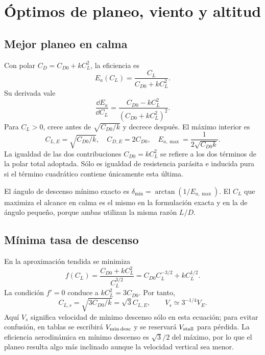\chapter{Óptimos de planeo, viento y altitud}\label{ch:planeo-punto}

\section{Mejor planeo en calma}
Con polar $C_D=C_{D0}+kC_L^2$, la eficiencia es
\begin{equation}
E_a(C_L)=\frac{C_L}{C_{D0}+kC_L^2}.
\end{equation}
Su derivada vale
\begin{equation}
\frac{\dd E_a}{\dd C_L}=
\frac{C_{D0}-kC_L^2}{(C_{D0}+kC_L^2)^2}.
\end{equation}
Para $C_L>0$, crece antes de $\sqrt{C_{D0}/k}$ y decrece después. El máximo interior es
\begin{equation}
C_{L,E}=\sqrt{C_{D0}/k},\quad C_{D,E}=2C_{D0},\quad
E_{a,\max}=\frac1{2\sqrt{C_{D0}k}}.\label{eq:ldmax}
\end{equation}
La igualdad de las dos contribuciones $C_{D0}=kC_L^2$ se refiere a los dos términos de la polar total adoptada. Sólo es igualdad de resistencia parásita e inducida pura si el término cuadrático contiene únicamente esta última.

El ángulo de descenso mínimo exacto es $\delta_{\min}=\arctan(1/E_{a,\max})$. El $C_L$ que maximiza el alcance en calma es el mismo en la formulación exacta y en la de ángulo pequeño, porque ambas utilizan la misma razón $L/D$.

\section{Mínima tasa de descenso}
En la aproximación tendida se minimiza
\begin{equation}
f(C_L)=\frac{C_{D0}+kC_L^2}{C_L^{3/2}}
=C_{D0}C_L^{-3/2}+kC_L^{1/2}.
\end{equation}
La condición $f'=0$ conduce a $kC_L^2=3C_{D0}$. Por tanto,
\begin{equation}
C_{L,s}=\sqrt{3C_{D0}/k}=\sqrt3C_{L,E},\qquad
V_s\simeq3^{-1/4}V_E.
\label{eq:min-sink}
\end{equation}
Aquí $V_s$ significa velocidad de mínimo descenso sólo en esta ecuación; para evitar confusión, en tablas se escribirá $V_{\rm min\,desc}$ y se reservará $V_{\rm stall}$ para pérdida. La eficiencia aerodinámica en mínimo descenso es $\sqrt3/2$ del máximo, por lo que el planeo resulta algo más inclinado aunque la velocidad vertical sea menor.


